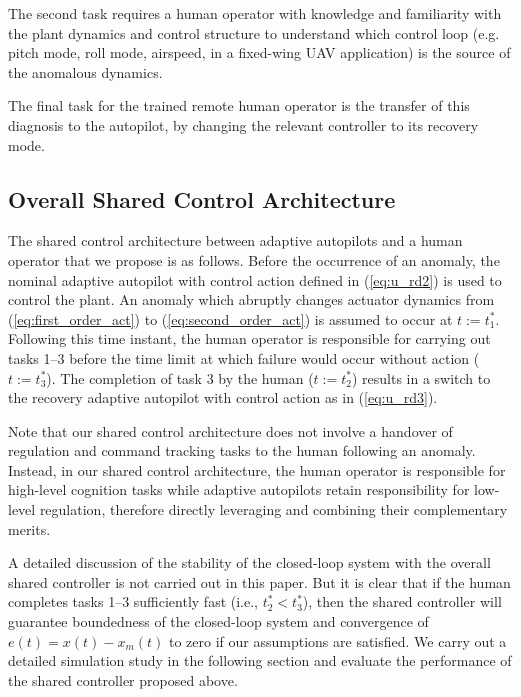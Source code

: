 \documentclass[english]{ifacconf}
\begin{document}
The second task requires a human operator with knowledge and familiarity with the plant dynamics and control structure to understand which control loop (e.g. pitch mode, roll mode, airspeed, in a fixed-wing UAV application) is the source of the anomalous dynamics. 

The final task for the trained remote human operator is the transfer of this diagnosis to the autopilot, by changing the relevant controller to its recovery mode.

\subsection{Overall Shared Control Architecture}\label{subsec:sc_overall}

The shared control architecture between adaptive autopilots and a human operator that we propose is as follows. Before the occurrence of an anomaly, the nominal adaptive autopilot with control action defined in (\ref{eq:u_rd2}) is used to control the plant. An anomaly which abruptly changes actuator dynamics from (\ref{eq:first_order_act}) to (\ref{eq:second_order_act}) is assumed to occur at $t := t_1^*$. Following this time instant, the human operator is responsible for carrying out tasks 1--3 before the time limit at which failure would occur without action ($t:=t_3^*$). The completion of task 3 by the human ($t := t_2^*$) results in a switch to the recovery adaptive autopilot with control action as in (\ref{eq:u_rd3}). 

Note that our shared control architecture does not involve a handover of regulation and command tracking tasks to the human following an anomaly. Instead, in our shared control architecture, the human operator is responsible for high-level cognition tasks while adaptive autopilots retain responsibility for low-level regulation, therefore directly leveraging and combining their complementary merits.

A detailed discussion of the stability of the closed-loop system with the overall shared controller is not carried out in this paper. But it is clear that if the human completes tasks 1--3 sufficiently fast (i.e., $t_2^* < t_3^*$), then the shared controller will guarantee boundedness of the closed-loop system and convergence of $e(t) = x(t) - x_m(t)$ to zero if our assumptions are satisfied. We carry out a detailed simulation study in the following section and evaluate the performance of the shared controller proposed above.
\end{document}
